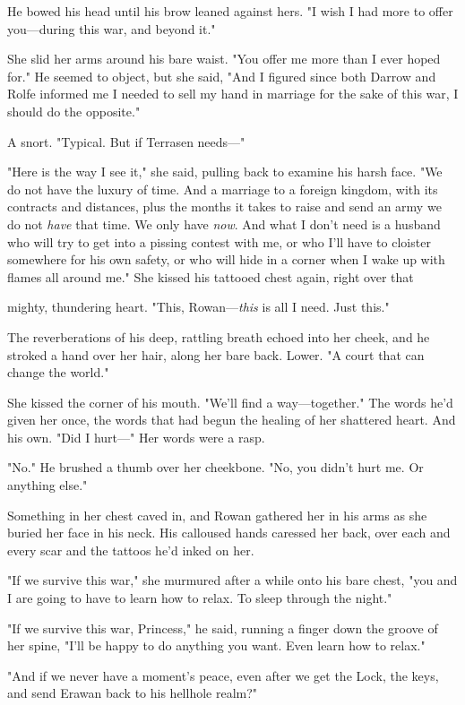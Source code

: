 He bowed his head until his brow leaned against hers. "I wish I had more to offer you---during this war, and beyond it."

She slid her arms around his bare waist. "You offer me more than I ever hoped for." He seemed to object, but she said, "And I figured since both Darrow and Rolfe informed me I needed to sell my hand in marriage for the sake of this war, I should do the opposite."

A snort. "Typical. But if Terrasen needs---"

"Here is the way I see it," she said, pulling back to examine his harsh face. "We do not have the luxury of time. And a marriage to a foreign kingdom, with its contracts and distances, plus the months it takes to raise and send an army  we do not \emph{have} that time. We only have \emph{now}. And what I don't need is a husband who will try to get into a pissing contest with me, or who I'll have to cloister somewhere for his own safety, or who will hide in a corner when I wake up with flames all around me." She kissed his tattooed chest again, right over that

mighty, thundering heart. "This, Rowan---\emph{this} is all I need. Just this."

The reverberations of his deep, rattling breath echoed into her cheek, and he stroked a hand over her hair, along her bare back. Lower. "A court that can change the world."

She kissed the corner of his mouth. "We'll find a way---together." The words he'd given her once, the words that had begun the healing of her shattered heart. And his own. "Did I hurt---" Her words were a rasp.

"No." He brushed a thumb over her cheekbone. "No, you didn't hurt me. Or anything else."

Something in her chest caved in, and Rowan gathered her in his arms as she buried her face in his neck. His calloused hands caressed her back, over each and every scar and the tattoos he'd inked on her.

"If we survive this war," she murmured after a while onto his bare chest, "you and I are going to have to learn how to relax. To sleep through the night."

"If we survive this war, Princess," he said, running a finger down the groove of her spine, "I'll be happy to do anything you want. Even learn how to relax."

"And if we never have a moment's peace, even after we get the Lock, the keys, and send Erawan back to his hellhole realm?"

